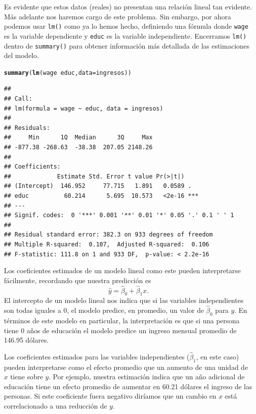\documentclass{article}\usepackage[]{graphicx}\usepackage[]{color}
\makeatletter
\newcommand{\hlopt}[1]{\textcolor[rgb]{0,0,0}{#1}}%
\newcommand{\hlstd}[1]{\textcolor[rgb]{0.345,0.345,0.345}{#1}}%
\newcommand{\hlkwc}[1]{\textcolor[rgb]{0.333,0.667,0.333}{#1}}%
\newcommand{\hlkwd}[1]{\textcolor[rgb]{0.737,0.353,0.396}{\textbf{#1}}}%
\newenvironment{kframe}{%
 \def\at@end@of@kframe{}%
 \ifinner\ifhmode%
  \def\at@end@of@kframe{\end{minipage}}%
  \begin{minipage}{\columnwidth}%
 \fi\fi%
 \def\FrameCommand##1{\hskip\@totalleftmargin \hskip-\fboxsep
 \colorbox{shadecolor}{##1}\hskip-\fboxsep
     \hskip-\linewidth \hskip-\@totalleftmargin \hskip\columnwidth}%
 \MakeFramed {\advance\hsize-\width
   \@totalleftmargin\z@ \linewidth\hsize
   \@setminipage}}%
 {\par\unskip\endMakeFramed%
 \at@end@of@kframe}
\newenvironment{knitrout}{}{} %
\makeatother
\begin{document}
Es evidente que estos datos (reales) no presentan una relación lineal tan evidente. Más adelante nos haremos cargo de este problema. Sin embargo, por ahora podemos usar \verb|lm()| como ya lo hemos hecho, definiendo una fórmula donde \verb|wage| es la variable dependiente y \verb|educ| es la variable independiente. Encerramos \verb|lm()| dentro de \verb|summary()| para obtener información más detallada de las estimaciones del modelo.

\begin{knitrout}
\color{fgcolor}\begin{kframe}
\begin{alltt}
\hlkwd{summary}\hlstd{(}\hlkwd{lm}\hlstd{(wage} \hlopt{~} \hlstd{educ,} \hlkwc{data} \hlstd{= ingresos))}
\end{alltt}
\begin{verbatim}
## 
## Call:
## lm(formula = wage ~ educ, data = ingresos)
## 
## Residuals:
##     Min      1Q  Median      3Q     Max 
## -877.38 -268.63  -38.38  207.05 2148.26 
## 
## Coefficients:
##             Estimate Std. Error t value Pr(>|t|)    
## (Intercept)  146.952     77.715   1.891   0.0589 .  
## educ          60.214      5.695  10.573   <2e-16 ***
## ---
## Signif. codes:  0 '***' 0.001 '**' 0.01 '*' 0.05 '.' 0.1 ' ' 1
## 
## Residual standard error: 382.3 on 933 degrees of freedom
## Multiple R-squared:  0.107,	Adjusted R-squared:  0.106 
## F-statistic: 111.8 on 1 and 933 DF,  p-value: < 2.2e-16
\end{verbatim}
\end{kframe}
\end{knitrout}



Los coeficientes estimados de un modelo lineal como este pueden interpretarse fácilmente, recordando que nuestra predicción es
\begin{equation*}
\hat y = \hat \beta_0 + \hat \beta_1 x.
\end{equation*}
El intercepto de un modelo lineal nos indica que si las variables independientes son todas iguales a 0, el modelo predice, en promedio, un valor de $\hat \beta_0$ para $y$. En términos de este modelo en particular, la interpretación es que si una persona tiene 0 años de educación el modelo predice un ingreso mensual promedio de 146.95 dólares.

Los coeficientes estimados para las variables independientes ($\hat \beta_1$, en este caso) pueden interpretarse como el efecto promedio que un aumento de una unidad de $x$ tiene sobre $y$. Por ejemplo, nuestra estimación indica que un año adicional de educación tiene un efecto promedio de aumentar en 60.21 dólares el ingreso de las personas. Si este coeficiente fuera negativo diríamos que un cambio en $x$ está correlacionado a una reducción de $y$.
\end{document}
